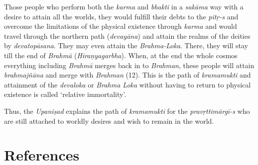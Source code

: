 Those people who perform both the \emph{karma} and \emph{bhakti} in a \emph{sakāma} way with a desire to attain all the worlds, they would fulfill their debts to the \emph{pitṛ-s} and overcome the limitations of the physical existence through \emph{karma} and would travel through the northern path (\emph{devayāna}) and attain the realms of the deities by \emph{devatopāsana}. They may even attain the \emph{Brahma-Loka}. There, they will stay till the end of \emph{Brahmā} (\emph{Hiraṇyagarbha}). When, at the end the whole cosmos everything including \emph{Brahmā} merges back in to \emph{Brahman}, these people will attain \emph{brahmajñāna} and merge with \emph{Brahman} (12). This is the path of \emph{kramamukti} and attainment of the \emph{devaloka} or \emph{Brahma Loka} without having to return to physical existence is called `relative immortality'.

Thus, the \emph{Upaniṣad} explains the path of \emph{kramamukti} for the \emph{pravṛttimārgī-s} who are still attached to worldly desires and wish to remain in the world.

\section*{References}

